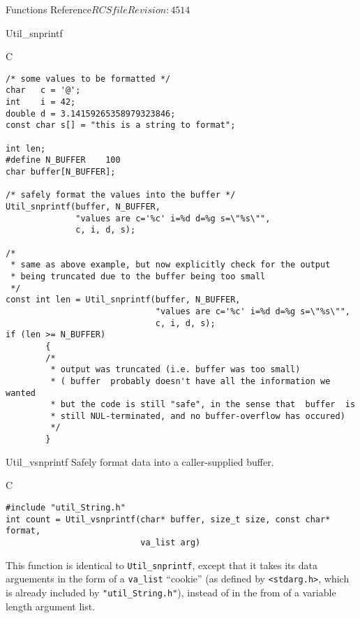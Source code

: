 \begin{cactuspart}{ Functions Reference}{$RCSfile$}{$Revision: 4514 $}
\begin{FunctionDescription}{Util\_snprintf}
\begin{ExampleSection}
\begin{Example}{C}
\begin{verbatim}
/* some values to be formatted */
char   c = '@';
int    i = 42;
double d = 3.14159265358979323846;
const char s[] = "this is a string to format";

int len;
#define N_BUFFER	100
char buffer[N_BUFFER];

/* safely format the values into the buffer */
Util_snprintf(buffer, N_BUFFER,
              "values are c='%c' i=%d d=%g s=\"%s\"",
              c, i, d, s);

/*
 * same as above example, but now explicitly check for the output
 * being truncated due to the buffer being too small
 */
const int len = Util_snprintf(buffer, N_BUFFER,
                              "values are c='%c' i=%d d=%g s=\"%s\"",
                              c, i, d, s);
if (len >= N_BUFFER)
        {
        /*
         * output was truncated (i.e. buffer was too small)
         * ( buffer  probably doesn't have all the information we wanted
         * but the code is still "safe", in the sense that  buffer  is
         * still NUL-terminated, and no buffer-overflow has occured)
         */
        }
\end{verbatim}
\end{Example}
\end{ExampleSection}
\end{FunctionDescription}

\begin{FunctionDescription}{Util\_vsnprintf}
\label{Util-vsnprintf}
Safely format data into a caller-supplied buffer.

\begin{SynopsisSection}
\begin{Synopsis}{C}
\begin{verbatim}
#include "util_String.h"
int count = Util_vsnprintf(char* buffer, size_t size, const char* format,
                           va_list arg)
\end{verbatim}
\end{Synopsis}
\end{SynopsisSection}

\begin{Discussion}
This function is identical to \verb|Util_snprintf|, except that it
takes its data arguements in the form of a \verb|va_list| ``cookie''
(as defined by \verb|<stdarg.h>|, which is already included by
\verb|"util_String.h"|), instead of in the from of a variable length
argument list.
\end{Discussion}


\end{FunctionDescription}
\end{cactuspart}

